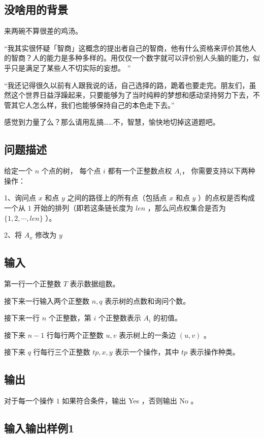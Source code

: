 \documentclass[UTF8]{ctexart}
\begin{document}
\subsection{没啥用的背景}

来两碗不算很差的鸡汤。

“我其实很怀疑「智商」这概念的提出者自己的智商，他有什么资格来评价其他人的智商？人的能力是多种多样的。用仅仅一个数字就可以评价别人头脑的能力，似乎只是满足了某些人不切实际的妄想。
”

“我还记得很久以前有人跟我说的话，自己选择的路，跪着也要走完。朋友们，虽然这个世界日益浮躁起来，只要能够为了当时纯粹的梦想和感动坚持努力下去，不管其它人怎么样，我们也能够保持自己的本色走下去。”

感觉到力量了么？那么请用乱搞……不，智慧，愉快地切掉这道题吧。

\subsection{问题描述}

给定一个 $n$ 个点的树， 每个点 $i$ 都有一个正整数点权 $A_i$， 你需要支持以下两种操作：

1、询问点 $x$ 和点 $y$ 之间的路径上的所有点（包括点 $x$ 和点 $y$ ）的点权是否构成一个从 $1$ 开始的排列（即若这条链长度为 $len$ ，那么问点权集合是否为 $\lbrace 1,2,\cdots,len\rbrace$ ）。

2、将 $A_x$ 修改为 $y$

\subsection{输入}

第一行一个正整数 $T$ 表示数据组数。

接下来一行输入两个正整数 $n,q$ 表示树的点数和询问个数。

接下来一行 $n$ 个正整数，第 $i$ 个正整数表示 $A_i$ 的初值。

接下来 $n−1$ 行每行两个正整数 $u,v$ 表示树上的一条边 $(u,v)$ 。

接下来 $q$ 行每行三个正整数 $tp,x,y$ 表示一个操作，其中 $tp$ 表示操作种类。

\subsection{输出}

对于每一个操作 $1$ 如果符合条件，输出 Yes ，否则输出 No 。

\subsection{输入输出样例1}
\end{document}
